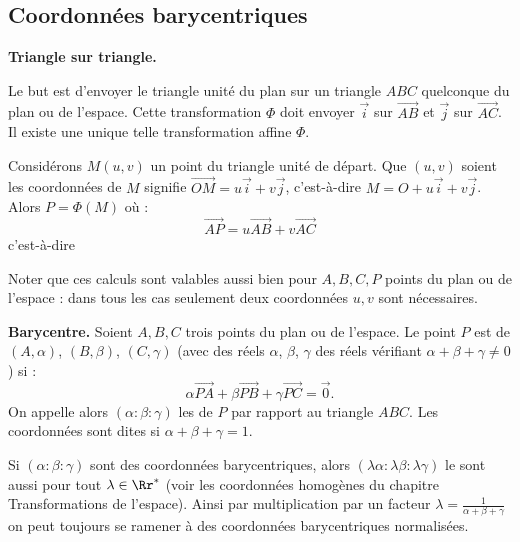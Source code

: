 \documentclass[11pt,class=report,crop=false]{standalone}
\begin{document}
\subsection{Coordonnées barycentriques}


\textbf{Triangle sur triangle.}

Le but est d'envoyer le triangle \og{}unité\fg{} du plan sur un triangle $ABC$ quelconque du plan ou de l'espace.
Cette transformation $\Phi$ doit envoyer $\vec i$ sur $\vec{AB}$ et $\vec j$ sur $\vec{AC}$.
Il existe une unique telle transformation affine $\Phi$.


Considérons $M(u,v)$ un point du triangle unité de départ. Que $(u,v)$ soient les coordonnées de $M$ signifie
$\vec{OM} = u \vec i + v \vec j$, c'est-à-dire $M = O + u \vec i + v \vec j$.
Alors $P = \Phi(M)$ où :
$$\vec{AP} = u \vec{AB} +v \vec{AC}$$
c'est-à-dire


Noter que ces calculs sont valables aussi bien pour $A,B,C,P$ points du plan ou de l'espace : dans tous les cas seulement deux coordonnées $u,v$ sont nécessaires.

\medskip
\textbf{Barycentre.}
Soient $A, B, C$ trois points du plan ou de l'espace.
Le point $P$ est  de $(A,\alpha)$, $(B,\beta)$, $(C,\gamma)$ (avec des réels $\alpha$, $\beta$, $\gamma$ des réels vérifiant $\alpha + \beta + \gamma \neq 0$) si :
$$\alpha \vec{PA} + \beta \vec{PB} + \gamma \vec{PC} = \vec{0}.$$
On appelle alors $(\alpha:\beta:\gamma)$ les  de $P$ par rapport au triangle $ABC$.
Les coordonnées sont dites  si $\alpha +\beta+\gamma = 1$.


Si $(\alpha:\beta:\gamma)$ sont des coordonnées barycentriques, alors $(\lambda \alpha : \lambda \beta : \lambda \gamma)$ le sont aussi pour tout $\lambda \in \Rr^*$ (voir les coordonnées homogènes du chapitre \og{}Transformations de l'espace\fg{}).
Ainsi par multiplication par un facteur $\lambda = \frac{1}{\alpha+\beta+\gamma}$ on peut toujours se ramener à des coordonnées barycentriques normalisées.
\end{document}

